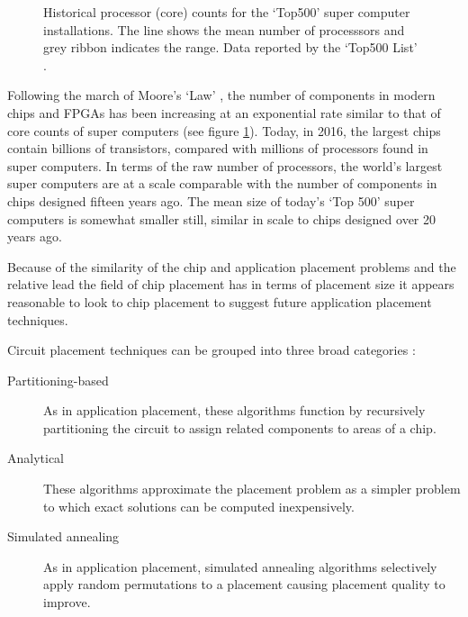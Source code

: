 			\begin{figure}
				\center
				
				\caption[Historical core counts for the `Top500' super computers.]%
				{Historical processor (core) counts for the `Top500' super
				computer installations. The line shows the mean number of processsors and
				grey ribbon indicates the range. Data reported by the `Top500 List'
				\cite{meuer16j}.}
				\label{fig:top500-num-processors}
			\end{figure}
			
			Following the march of Moore's `Law' \cite{moore65,moore75}, the number
			of components in modern chips and FPGAs has been increasing at an
			exponential rate similar to that of core counts of super computers (see
			figure \ref{fig:top500-num-processors}). Today, in 2016, the largest
			chips contain billions of transistors, compared with millions of
			processors found in super computers. In terms of the raw number of
			processors, the world's largest super computers are at a scale comparable
			with the number of components in chips designed fifteen years ago. The
			mean size of today's `Top 500' super computers is somewhat smaller still,
			similar in scale to chips designed over 20 years ago.
			
			Because of the similarity of the chip and application placement problems
			and the relative lead the field of chip placement has in terms of
			placement size it appears reasonable to look to chip placement to suggest
			future application placement techniques.
			
			Circuit placement techniques can be grouped into three broad categories
			\cite{kahng11}:
			
			\begin{description}
				
				\item[Partitioning-based] As in application placement, these algorithms
				function by recursively partitioning the circuit to assign
				related components to areas of a chip.
				
				\item[Analytical] These algorithms approximate the placement problem as
				a simpler problem to which exact solutions can be computed
				inexpensively.
				
				\item[Simulated annealing] As in application placement, simulated
				annealing algorithms selectively apply random permutations to a
				placement causing placement quality to improve.
				
			\end{description}
			
